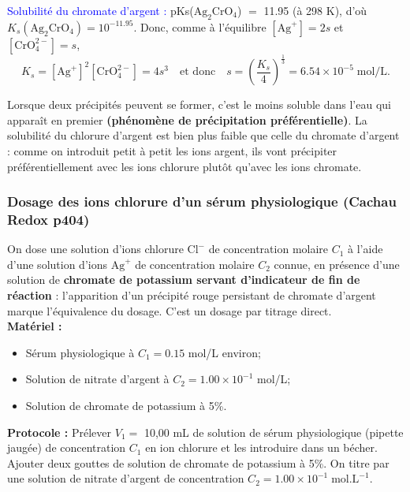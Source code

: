 \documentclass[11pt,a4paper]{report}
\begin{document}
\textcolor{blue}{Solubilité du chromate d'argent :} pKs($\text{Ag}_2\text{CrO}_4$) $=$ 11.95 (à 298 K), 
d'où $K_s(\text{Ag}_2\text{CrO}_4) = 10^{-11.95}$. Donc, comme à l'équilibre $[\text{Ag}^+] = 2s$ et $[\text{CrO}_4^{2-}] = s$,
\begin{equation}
	K_s = [\text{Ag}^+]^2[\text{CrO}_4^{2-}] = 4s^3 \quad\text{et donc}\quad s 
	= \left(\frac{K_s}{4}\right)^\frac{1}{3} = 6.54\times10^{-5}\;\text{mol/L}.
\end{equation}

Lorsque deux précipités peuvent se former, c'est le moins soluble dans l'eau qui apparaît en premier \textbf{(phénomène de précipitation préférentielle)}. La solubilité du chlorure d'argent est bien plus faible que celle du chromate d'argent : comme on introduit petit à petit les ions argent, ils vont précipiter préférentiellement avec les ions chlorure plutôt qu'avec les ions chromate.

\subsubsection{Dosage des ions chlorure d'un sérum physiologique (Cachau Redox p404)}

On dose une solution d'ions chlorure $\text{Cl}^-$ de concentration molaire $C_1$ à l'aide d'une solution d'ions $\text{Ag}^+$ de concentration molaire $C_2$ connue, en présence d'une solution de 
\textbf{chromate de potassium servant d'indicateur de fin de réaction} : l'apparition d'un précipité rouge persistant de chromate d'argent marque l'équivalence du dosage. C'est un dosage par titrage direct. \\

\textbf{Matériel :}
\begin{itemize}
	\item Sérum physiologique à $C_1 = 0.15$ mol/L environ;
	\item Solution de nitrate d'argent à $C_2 = 1.00\times10^{-1}$ mol/L;
	\item Solution de chromate de potassium à 5\%.\\
\end{itemize}

\textbf{Protocole :}
Prélever $V_1 =$ 10,00 mL de solution de sérum physiologique (pipette jaugée) de concentration $C_1$ en ion chlorure et les introduire dans un bécher. Ajouter deux gouttes de solution de chromate de potassium à 5\%. On titre par une solution de nitrate d'argent de concentration $C_2 = 1.00\times10^{-1}\;\text{mol}.\text{L}^{-1}$.\\
\end{document}
